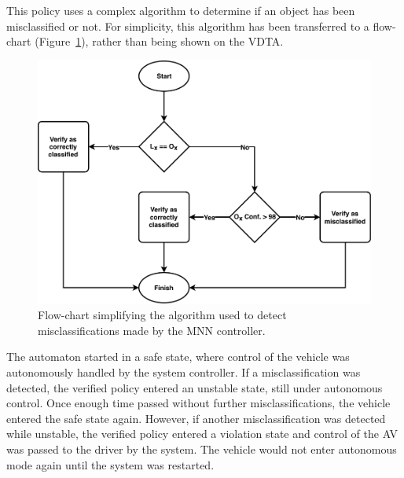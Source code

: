 This policy uses a complex algorithm to determine if an object has been misclassified or not.
For simplicity, this algorithm has been transferred to a flow-chart (Figure~\ref{fig:flow}), rather than being shown on the \ac{VDTA}.

\begin{figure}[h]
	\centering
	\includegraphics[width=\textwidth]{Content/fig/flow-misclassify.pdf}
	\caption{Flow-chart simplifying the algorithm used to detect misclassifications made by the \ac{MNN} controller.} \label{fig:flow}
\end{figure}

The automaton started in a safe state, where control of the vehicle was autonomously handled by the system controller.
If a misclassification was detected, the verified policy entered an unstable state, still under autonomous control. 
Once enough time passed without further misclassifications, the vehicle entered the safe state again.
However, if another misclassification was detected while unstable, the verified policy entered a violation state and control of the \ac{AV} was passed to the driver by the system.
The vehicle would not enter autonomous mode again until the system was restarted.






